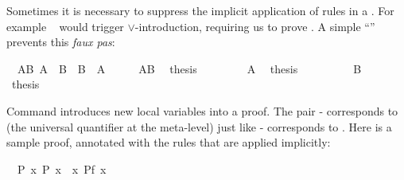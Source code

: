 \begin{isabellebody}
\begin{isamarkuptext}
Sometimes it is necessary to suppress the implicit application of rules in a
. For example ~ would
trigger $\lor$-introduction, requiring us to prove . A simple
``\isa{{\isacharminus}}'' prevents this \emph{faux pas}:%
\end{isamarkuptext}%
\isamarkupfalse%
\ \ AB{\isacharcolon}\ {\isachardoublequote}A\ {\isasymor}\ B{\isachardoublequote}\ \ {\isachardoublequote}B\ {\isasymor}\ A{\isachardoublequote}\isanewline
%
\isadelimproof
%
\endisadelimproof
%
\isatagproof
\isamarkupfalse%
\ {\isacharminus}\isanewline
\ \ \isamarkupfalse%
\ AB\ \isamarkupfalse%
\ {\isacharquery}thesis\isanewline
\ \ \isamarkupfalse%
\isanewline
\ \ \ \ \isamarkupfalse%
\ A\ \isamarkupfalse%
\ {\isacharquery}thesis\ \isamarkupfalse%
\isacommand{{\isachardot}{\isachardot}}\isanewline
\ \ \isamarkupfalse%
\isanewline
\ \ \ \ \isamarkupfalse%
\ B\ \isamarkupfalse%
\ {\isacharquery}thesis\ \isamarkupfalse%
\isacommand{{\isachardot}{\isachardot}}\isanewline
\ \ \isamarkupfalse%
\isanewline
\isamarkupfalse%
%
\endisatagproof
{\isafoldproof}%
%
\isadelimproof
%
\endisadelimproof
\isamarkuptrue%
%
\isamarkuptrue%
%
\begin{isamarkuptext}%
Command  introduces new local variables into a
proof. The pair - corresponds to \isa{{\isasymAnd}}
(the universal quantifier at the
meta-level) just like - corresponds to
\isa{{\isasymLongrightarrow}}. Here is a sample proof, annotated with the rules that are
applied implicitly:%
\end{isamarkuptext}%
\isamarkupfalse%
\ \ P{\isacharcolon}\ {\isachardoublequote}{\isasymforall}x{\isachardot}\ P\ x{\isachardoublequote}\ \ {\isachardoublequote}{\isasymforall}x{\isachardot}\ P{\isacharparenleft}f\ x{\isacharparenright}{\isachardoublequote}\isanewline
%
\isadelimproof
%
\endisadelimproof
%
\isatagproof
\isamarkupfalse%
\ \ \ \ \ \ \ \ \ \ \ \ \ \ \ \ \ \ \ \ \ \ \ %
\end{isabellebody}

